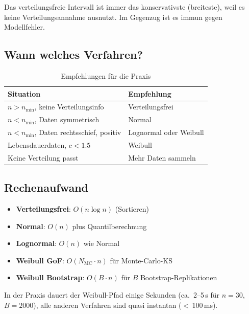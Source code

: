\documentclass[10pt,a4paper,twocolumn]{article}
\theoremstyle{definition}
\begin{document}
Das verteilungsfreie Intervall ist immer das konservativste
(breiteste), weil es keine Verteilungsannahme ausnutzt.
Im Gegenzug ist es immun gegen Modellfehler.

\subsection{Wann welches Verfahren?}

\begin{table}[H]
\centering
\caption{Empfehlungen für die Praxis}
\label{tab:empfehlung}
\small
\begin{tabular}{@{}p{3.2cm}p{4cm}@{}}
\toprule
\textbf{Situation} & \textbf{Empfehlung} \\
\midrule
$n > n_{\min}$, keine Verteilungsinfo &
    Verteilungsfrei \\[3pt]
$n < n_{\min}$, Daten symmetrisch &
    Normal \\[3pt]
$n < n_{\min}$, Daten rechtsschief, positiv &
    Lognormal oder Weibull \\[3pt]
Lebensdauerdaten, $c < 1.5$ &
    Weibull \\[3pt]
Keine Verteilung passt &
    Mehr Daten sammeln \\
\bottomrule
\end{tabular}
\end{table}

\subsection{Rechenaufwand}

\begin{itemize}[nosep,leftmargin=*]
    \item \textbf{Verteilungsfrei}: $O(n \log n)$ (Sortieren)
    \item \textbf{Normal}: $O(n)$ plus Quantilberechnung
    \item \textbf{Lognormal}: $O(n)$ wie Normal
    \item \textbf{Weibull GoF}: $O(N_{\text{MC}} \cdot n)$ für
          Monte-Carlo-KS
    \item \textbf{Weibull Bootstrap}: $O(B \cdot n)$ für $B$
          Bootstrap-Replikationen
\end{itemize}

In der Praxis dauert der Weibull-Pfad einige Sekunden
(ca.\ 2--5\,s für $n=30$, $B=2000$), alle anderen Verfahren
sind quasi instantan ($<$\,100\,ms).


\end{document}
